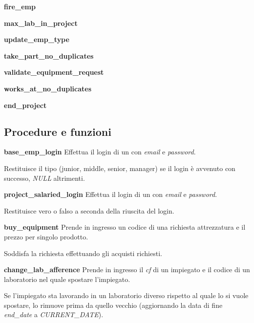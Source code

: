 \noindent \textbf{fire\_emp}
\bigskip

\noindent \textbf{max\_lab\_in\_project}
\bigskip

\noindent \textbf{update\_emp\_type}
\bigskip

\newpage
\noindent \textbf{take\_part\_no\_duplicates}
\bigskip

\noindent \textbf{validate\_equipment\_request}
\bigskip

\noindent \textbf{works\_at\_no\_duplicates}
\bigskip

\noindent \textbf{end\_project}


\newpage
\subsection{Procedure e funzioni}
\noindent \textbf{base\_emp\_login}\sskip
Effettua il login di un \textit{\baseemp} con \textit{email} e \textit{password}.

Restituisce il tipo (junior, middle, senior, manager) se il login è avvenuto con successo, \textit{NULL} altrimenti.
\bigskip

\noindent \textbf{project\_salaried\_login}\sskip
Effettua il login di un \textit{\projectsalaried} con \textit{email} e \textit{password}.

Restituisce vero o falso a seconda della riuscita del login.
\bigskip

\newpage
\noindent \textbf{buy\_equipment}\sskip
Prende in ingresso un codice di una richiesta attrezzatura e il prezzo per singolo prodotto.

Soddisfa la richiesta effettuando gli acquisti richiesti.
\bigskip

\newpage
\noindent \textbf{change\_lab\_afference}\sskip
Prende in ingresso il \textit{cf} di un impiegato e il codice di un laboratorio nel quale spostare l'impiegato.

Se l'impiegato sta lavorando in un laboratorio diverso rispetto al quale lo si vuole spostare, lo rimuove prima da quello vecchio (aggiornando la data di fine \textit{end\_date} a \textit{CURRENT\_DATE}).

